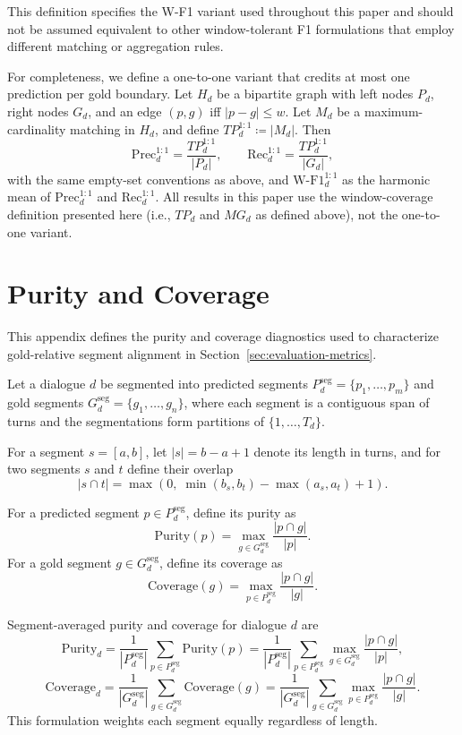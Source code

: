 This definition specifies the W-F1 variant used throughout this paper and should
not be assumed equivalent to other window-tolerant F1 formulations that employ
different matching or aggregation rules.

For completeness, we define a one-to-one variant that credits at most one prediction
per gold boundary. Let $H_d$ be a bipartite graph with left nodes $P_d$, right nodes $G_d$,
and an edge $(p,g)$ iff $|p-g|\le w$. Let $M_d$ be a maximum-cardinality matching in $H_d$,
and define $TP^{1{:}1}_d \coloneqq |M_d|$. Then
\[
\mathrm{Prec}^{1{:}1}_d = \frac{TP^{1{:}1}_d}{|P_d|},\qquad
\mathrm{Rec}^{1{:}1}_d = \frac{TP^{1{:}1}_d}{|G_d|},
\]
with the same empty-set conventions as above, and
$\mathrm{W\text{-}F1}^{1{:}1}_d$ as the harmonic mean of
$\mathrm{Prec}^{1{:}1}_d$ and $\mathrm{Rec}^{1{:}1}_d$.
All results in this paper use the window-coverage definition presented here
(i.e., $TP_d$ and $MG_d$ as defined above), not the one-to-one variant.

\section{Purity and Coverage}
\label{app:purity-coverage}
This appendix defines the purity and coverage diagnostics used to
characterize gold-relative segment alignment in
Section~\ref{sec:evaluation-metrics}.

Let a dialogue $d$ be segmented into predicted segments
$P^{\mathrm{seg}}_d = \{p_1,\dots,p_m\}$ and gold segments
$G^{\mathrm{seg}}_d = \{g_1,\dots,g_n\}$, where each segment is a contiguous span
of turns and the segmentations form partitions of $\{1,\dots,T_d\}$.

For a segment $s = [a,b]$, let $|s| = b-a+1$ denote its length in turns, and for
two segments $s$ and $t$ define their overlap
\[
|s \cap t| = \max\!\left(0,\; \min(b_s,b_t) - \max(a_s,a_t) + 1\right).
\]

For a predicted segment $p \in P^{\mathrm{seg}}_d$, define its purity as
\[
\mathrm{Purity}(p)
= \max_{g \in G^{\mathrm{seg}}_d} \frac{|p \cap g|}{|p|}.
\]
For a gold segment $g \in G^{\mathrm{seg}}_d$, define its coverage as
\[
\mathrm{Coverage}(g)
= \max_{p \in P^{\mathrm{seg}}_d} \frac{|p \cap g|}{|g|}.
\]

Segment-averaged purity and coverage for dialogue $d$ are
\[
\mathrm{Purity}_d
= \frac{1}{|P^{\mathrm{seg}}_d|}\sum_{p \in P^{\mathrm{seg}}_d}
\mathrm{Purity}(p)
= \frac{1}{|P^{\mathrm{seg}}_d|}\sum_{p \in P^{\mathrm{seg}}_d}
\max_{g \in G^{\mathrm{seg}}_d} \frac{|p \cap g|}{|p|},
\]
\[
\mathrm{Coverage}_d
= \frac{1}{|G^{\mathrm{seg}}_d|}\sum_{g \in G^{\mathrm{seg}}_d}
\mathrm{Coverage}(g)
= \frac{1}{|G^{\mathrm{seg}}_d|}\sum_{g \in G^{\mathrm{seg}}_d}
\max_{p \in P^{\mathrm{seg}}_d} \frac{|p \cap g|}{|g|}.
\]
This formulation weights each segment equally regardless of length.

